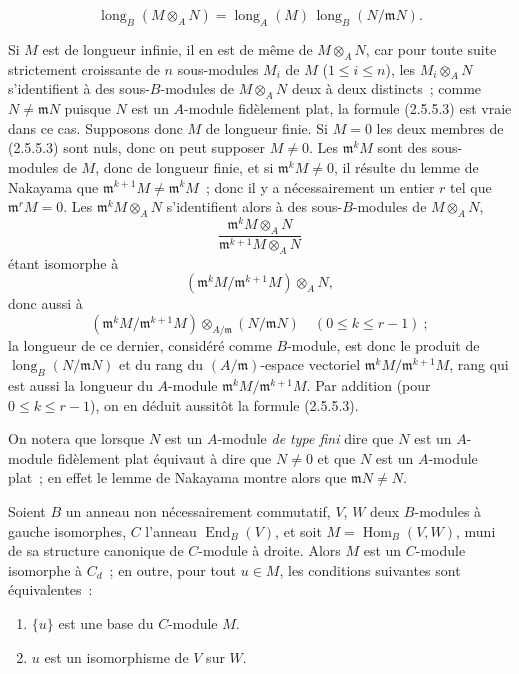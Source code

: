 \begin{env}[2.5.5.3]
\label{IV.2.5.5.3-fr}
\[
\operatorname{long}_B(M\otimes_A N)
=\operatorname{long}_A(M)\,
 \operatorname{long}_B(N/\mathfrak mN).
\]
\end{env}

Si $M$ est de longueur infinie, il en est de même de $M\otimes_A N$, car
pour toute suite strictement croissante de $n$ sous-modules $M_i$ de $M$
($1\leq i\leq n$), les $M_i\otimes_A N$ s'identifient à des sous-$B$-modules
de $M\otimes_A N$ deux à deux distincts~; comme
$N\ne\mathfrak mN$ puisque $N$ est un $A$-module fidèlement plat, la formule
(2.5.5.3) est vraie dans ce cas. Supposons donc $M$ de longueur finie. Si
$M=0$ les deux membres de (2.5.5.3) sont nuls, donc on peut supposer
$M\ne0$. Les $\mathfrak m^kM$ sont des sous-modules de $M$, donc de longueur
finie, et si $\mathfrak m^kM\ne0$, il résulte du lemme de Nakayama que
$\mathfrak m^{k+1}M\ne\mathfrak m^kM$~; donc il y a nécessairement un entier
$r$ tel que $\mathfrak m^rM=0$. Les
$\mathfrak m^kM\otimes_A N$ s'identifient alors à des sous-$B$-modules de
$M\otimes_A N$,
\[
\frac{\mathfrak m^kM\otimes_A N}{\mathfrak m^{k+1}M\otimes_A N}
\]
étant isomorphe à
\[
(\mathfrak m^kM/\mathfrak m^{k+1}M)\otimes_A N,
\]
donc aussi à
\[
(\mathfrak m^kM/\mathfrak m^{k+1}M)
\otimes_{A/\mathfrak m}(N/\mathfrak mN)
\quad(0\leq k\leq r-1)~;
\]
la longueur de ce dernier, considéré comme $B$-module, est donc le produit de
$\operatorname{long}_B(N/\mathfrak mN)$ et du rang du
$(A/\mathfrak m)$-espace vectoriel
$\mathfrak m^kM/\mathfrak m^{k+1}M$, rang qui est aussi la longueur du
$A$-module $\mathfrak m^kM/\mathfrak m^{k+1}M$. Par addition (pour
$0\leq k\leq r-1$), on en déduit aussitôt la formule (2.5.5.3).

\begin{remark}[2.5.5.4]
\label{IV.2.5.5.4-fr}
On notera que lorsque $N$ est un $A$-module \emph{de type fini} dire que $N$
est un $A$-module fidèlement plat équivaut à dire que $N\ne0$ et que $N$ est
un $A$-module plat~; en effet le lemme de Nakayama montre alors que
$\mathfrak mN\ne N$.
\end{remark}

\begin{lemma}[2.5.6]
\label{IV.2.5.6-fr}
Soient $B$ un anneau non nécessairement commutatif, $V$, $W$ deux
$B$-modules à gauche isomorphes, $C$ l'anneau
$\operatorname{End}_B(V)$, et soit
$M=\operatorname{Hom}_B(V,W)$, muni de sa structure canonique de
$C$-module à droite. Alors $M$ est un $C$-module isomorphe à $C_d$~; en
outre, pour tout $u\in M$, les conditions suivantes sont équivalentes~:
\begin{enumerate}
\item[\emph{a)}] $\{u\}$ est une base du $C$-module $M$.
\item[\emph{b)}] $u$ est un isomorphisme de $V$ sur $W$.
\end{enumerate}
\end{lemma}

